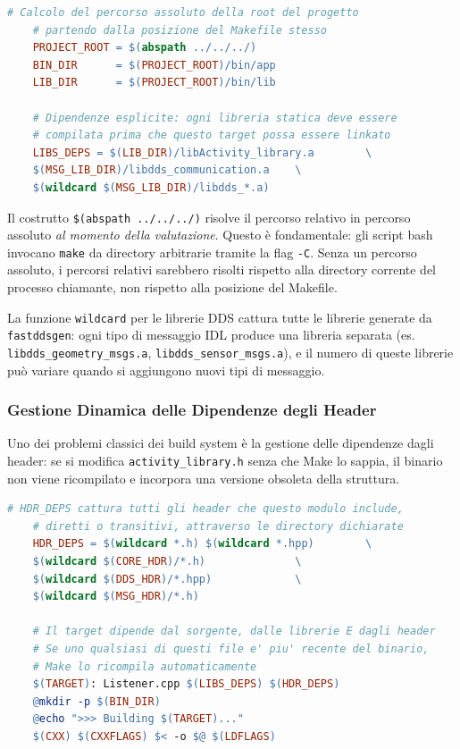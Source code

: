 \begin{lstlisting}[language=make, caption={Makefile del nodo Listener: risoluzione path e dipendenze}]
	# Calcolo del percorso assoluto della root del progetto
	# partendo dalla posizione del Makefile stesso
	PROJECT_ROOT = $(abspath ../../../)
	BIN_DIR      = $(PROJECT_ROOT)/bin/app
	LIB_DIR      = $(PROJECT_ROOT)/bin/lib
	
	# Dipendenze esplicite: ogni libreria statica deve essere
	# compilata prima che questo target possa essere linkato
	LIBS_DEPS = $(LIB_DIR)/libActivity_library.a        \
	$(MSG_LIB_DIR)/libdds_communication.a    \
	$(wildcard $(MSG_LIB_DIR)/libdds_*.a)
\end{lstlisting}

Il costrutto \texttt{\$(abspath ../../../)} risolve il percorso relativo in percorso assoluto \textit{al momento della valutazione}. Questo è fondamentale: gli script bash invocano \texttt{make} da directory arbitrarie tramite la flag \texttt{-C}. Senza un percorso assoluto, i percorsi relativi sarebbero risolti rispetto alla directory corrente del processo chiamante, non rispetto alla posizione del Makefile.

La funzione \texttt{wildcard} per le librerie DDS cattura tutte le librerie generate da \texttt{fastddsgen}: ogni tipo di messaggio IDL produce una libreria separata (es. \texttt{libdds\_geometry\_msgs.a}, \texttt{libdds\_sensor\_msgs.a}), e il numero di queste librerie può variare quando si aggiungono nuovi tipi di messaggio.

\subsubsection{Gestione Dinamica delle Dipendenze degli Header}

Uno dei problemi classici dei build system è la gestione delle dipendenze dagli header: se si modifica \texttt{activity\_library.h} senza che Make lo sappia, il binario non viene ricompilato e incorpora una versione obsoleta della struttura.

\begin{lstlisting}[language=make, caption={Tracking automatico degli header per la ricompilazione}]
	# HDR_DEPS cattura tutti gli header che questo modulo include,
	# diretti o transitivi, attraverso le directory dichiarate
	HDR_DEPS = $(wildcard *.h) $(wildcard *.hpp)        \
	$(wildcard $(CORE_HDR)/*.h)              \
	$(wildcard $(DDS_HDR)/*.hpp)             \
	$(wildcard $(MSG_HDR)/*.h)
	
	# Il target dipende dal sorgente, dalle librerie E dagli header
	# Se uno qualsiasi di questi file e' piu' recente del binario,
	# Make lo ricompila automaticamente
	$(TARGET): Listener.cpp $(LIBS_DEPS) $(HDR_DEPS)
	@mkdir -p $(BIN_DIR)
	@echo ">>> Building $(TARGET)..."
	$(CXX) $(CXXFLAGS) $< -o $@ $(LDFLAGS)
\end{lstlisting}

